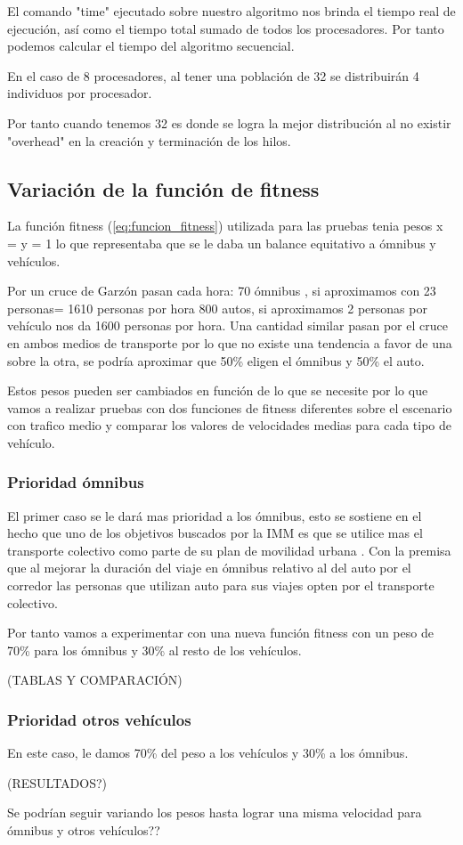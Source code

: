 El comando "time" ejecutado sobre nuestro algoritmo nos brinda el tiempo real de ejecución, así como el tiempo total sumado de todos los procesadores. Por tanto podemos calcular el tiempo del algoritmo secuencial.

En el caso de 8 procesadores, al tener una población de 32 se distribuirán 4 individuos por procesador.

Por tanto cuando tenemos 32 es donde se logra la mejor distribución al no existir "overhead" en la creación y terminación de los hilos.


\subsection{Variación de la función de fitness}

La función fitness (\ref{eq:funcion_fitness}) utilizada para las pruebas tenia pesos x = y = 1 lo que representaba que se le daba un balance equitativo a ómnibus y vehículos.

Por un cruce de Garzón pasan cada hora:
70 ómnibus , si aproximamos con 23 personas= 1610 personas por hora
800 autos, si aproximamos  2 personas por vehículo nos da 1600 personas por hora.
Una cantidad similar  pasan por el cruce en ambos medios de transporte por lo que no existe una tendencia a favor de una sobre la otra, se podría aproximar que 50\% eligen el ómnibus y 50\% el auto.



Estos pesos pueden ser cambiados en función de lo que se necesite por lo que vamos a realizar pruebas con dos funciones de fitness diferentes sobre el escenario con trafico medio y comparar los valores de velocidades medias para cada tipo de vehículo.


\subsubsection{Prioridad ómnibus}
El primer caso se le dará mas prioridad a los ómnibus, esto se sostiene en el hecho que uno de los objetivos buscados por la IMM  es que se utilice mas el transporte colectivo como parte de su plan de movilidad urbana \citep{PlanMovilidad}. Con la premisa que al mejorar la duración del viaje en ómnibus relativo al del auto por el corredor las personas que utilizan auto para sus viajes opten por el transporte colectivo.

Por tanto vamos a experimentar con una nueva función fitness con un peso de 70\% para los ómnibus y 30\% al resto de los vehículos.

(TABLAS Y COMPARACIÓN) 

\subsubsection{Prioridad otros vehículos}

En este caso, le damos 70\% del peso a los vehículos y 30\% a los ómnibus.

(RESULTADOS?)

Se podrían seguir variando los pesos hasta lograr una misma velocidad para ómnibus y otros vehículos??




